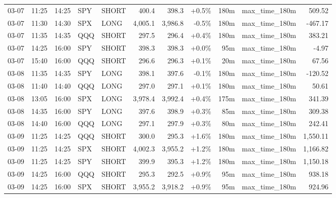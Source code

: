 \documentclass[11pt,a4paper,twoside]{article}
\begin{document}
\begin{center}
\begin{longtable}{>{\color{txtmain}}l l l l l r r r r >{\color{txtmain}}l r}
03-07 & 11:25 & 14:25 & SPY & SHORT & 400.4 & 398.3 & \textcolor{wingreen}{+0.5\%} & 180m & max\_time\_180m & \textcolor{wingreen}{509.52} \\
03-07 & 11:30 & 14:30 & SPX & LONG & 4,005.1 & 3,986.8 & \textcolor{lossred}{-0.5\%} & 180m & max\_time\_180m & \textcolor{lossred}{-467.17} \\
03-07 & 11:35 & 14:35 & QQQ & SHORT & 297.5 & 296.4 & \textcolor{wingreen}{+0.4\%} & 180m & max\_time\_180m & \textcolor{wingreen}{383.21} \\
03-07 & 14:25 & 16:00 & SPY & SHORT & 398.3 & 398.3 & \textcolor{wingreen}{+0.0\%} & 95m & max\_time\_180m & \textcolor{lossred}{-4.97} \\
03-07 & 15:40 & 16:00 & QQQ & SHORT & 296.6 & 296.3 & \textcolor{wingreen}{+0.1\%} & 20m & max\_time\_180m & \textcolor{wingreen}{67.56} \\
03-08 & 11:35 & 14:35 & SPY & LONG & 398.1 & 397.6 & \textcolor{lossred}{-0.1\%} & 180m & max\_time\_180m & \textcolor{lossred}{-120.52} \\
03-08 & 11:40 & 14:40 & QQQ & LONG & 297.0 & 297.1 & \textcolor{wingreen}{+0.1\%} & 180m & max\_time\_180m & \textcolor{wingreen}{50.61} \\
03-08 & 13:05 & 16:00 & SPX & LONG & 3,978.4 & 3,992.4 & \textcolor{wingreen}{+0.4\%} & 175m & max\_time\_180m & \textcolor{wingreen}{341.39} \\
03-08 & 14:35 & 16:00 & SPY & LONG & 397.6 & 398.9 & \textcolor{wingreen}{+0.3\%} & 85m & max\_time\_180m & \textcolor{wingreen}{309.38} \\
03-08 & 14:40 & 16:00 & QQQ & LONG & 297.1 & 297.9 & \textcolor{wingreen}{+0.3\%} & 80m & max\_time\_180m & \textcolor{wingreen}{242.41} \\
03-09 & 11:25 & 14:25 & QQQ & SHORT & 300.0 & 295.3 & \textcolor{wingreen}{+1.6\%} & 180m & max\_time\_180m & \textcolor{wingreen}{1,550.11} \\
03-09 & 11:25 & 14:25 & SPX & SHORT & 4,002.3 & 3,955.2 & \textcolor{wingreen}{+1.2\%} & 180m & max\_time\_180m & \textcolor{wingreen}{1,166.82} \\
03-09 & 11:25 & 14:25 & SPY & SHORT & 399.9 & 395.3 & \textcolor{wingreen}{+1.2\%} & 180m & max\_time\_180m & \textcolor{wingreen}{1,150.18} \\
03-09 & 14:25 & 16:00 & QQQ & SHORT & 295.3 & 292.5 & \textcolor{wingreen}{+0.9\%} & 95m & max\_time\_180m & \textcolor{wingreen}{938.18} \\
03-09 & 14:25 & 16:00 & SPX & SHORT & 3,955.2 & 3,918.2 & \textcolor{wingreen}{+0.9\%} & 95m & max\_time\_180m & \textcolor{wingreen}{924.96} \\

\end{longtable}
\end{center}
\end{document}
